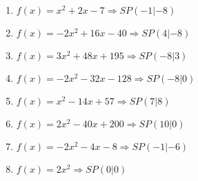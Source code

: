 \documentclass{article}%
\begin{document}
\begin{enumerate}[label=\alph*)]
\item%
\newline\vspace{0.5cm}$f(x)=x^2 + 2x - 7 \Rightarrow SP(-1|-8) $%
\item%
\newline\vspace{0.5cm}$f(x)=-2x^2 + 16x - 40 \Rightarrow SP(4|-8) $%
\item%
\newline\vspace{0.5cm}$f(x)=3x^2 + 48x + 195 \Rightarrow SP(-8|3) $%
\item%
\newline\vspace{0.5cm}$f(x)=-2x^2 - 32x - 128 \Rightarrow SP(-8|0) $%
\item%
\newline\vspace{0.5cm}$f(x)=x^2 - 14x + 57 \Rightarrow SP(7|8) $%
\item%
\newline\vspace{0.5cm}$f(x)=2x^2 - 40x + 200 \Rightarrow SP(10|0) $%
\item%
\newline\vspace{0.5cm}$f(x)=-2x^2 - 4x - 8 \Rightarrow SP(-1|-6) $%
\item%
\newline\vspace{0.5cm}$f(x)=2x^2 \Rightarrow SP(0|0) $%
\end{enumerate}

%
\end{document}
